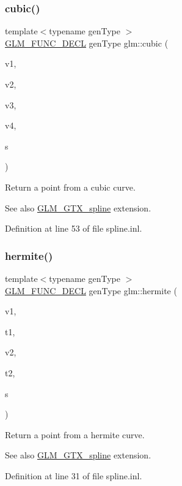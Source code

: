 \subsubsection{\texorpdfstring{cubic()}{cubic()}}
{\footnotesize\ttfamily template$<$typename gen\+Type $>$ \\
\mbox{\hyperlink{setup_8hpp_ab2d052de21a70539923e9bcbf6e83a51}{G\+L\+M\+\_\+\+F\+U\+N\+C\+\_\+\+D\+E\+CL}} gen\+Type glm\+::cubic (\begin{DoxyParamCaption}\item[{gen\+Type const \&}]{v1,  }\item[{gen\+Type const \&}]{v2,  }\item[{gen\+Type const \&}]{v3,  }\item[{gen\+Type const \&}]{v4,  }\item[{typename gen\+Type\+::value\+\_\+type const \&}]{s }\end{DoxyParamCaption})}

Return a point from a cubic curve. \begin{DoxySeeAlso}{See also}
\mbox{\hyperlink{group__gtx__spline}{G\+L\+M\+\_\+\+G\+T\+X\+\_\+spline}} extension. 
\end{DoxySeeAlso}


Definition at line 53 of file spline.\+inl.

\mbox{\label{group__gtx__spline_gaa69e143f6374d32f934a8edeaa50bac9}} 
\subsubsection{\texorpdfstring{hermite()}{hermite()}}
{\footnotesize\ttfamily template$<$typename gen\+Type $>$ \\
\mbox{\hyperlink{setup_8hpp_ab2d052de21a70539923e9bcbf6e83a51}{G\+L\+M\+\_\+\+F\+U\+N\+C\+\_\+\+D\+E\+CL}} gen\+Type glm\+::hermite (\begin{DoxyParamCaption}\item[{gen\+Type const \&}]{v1,  }\item[{gen\+Type const \&}]{t1,  }\item[{gen\+Type const \&}]{v2,  }\item[{gen\+Type const \&}]{t2,  }\item[{typename gen\+Type\+::value\+\_\+type const \&}]{s }\end{DoxyParamCaption})}

Return a point from a hermite curve. \begin{DoxySeeAlso}{See also}
\mbox{\hyperlink{group__gtx__spline}{G\+L\+M\+\_\+\+G\+T\+X\+\_\+spline}} extension. 
\end{DoxySeeAlso}


Definition at line 31 of file spline.\+inl.

